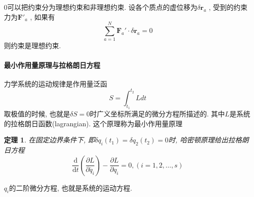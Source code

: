 \documentclass[a4paper,11pt]{article}
\theoremstyle{mystyle}
\newtheorem{theorem}{\hspace{2em}定理}[section]
\begin{document}
$0$可以把约束分为理想约束和非理想约束. 设各个质点的虚位移为$\delta\mathbf{r}_a$ , 受到的约束力为$\mathbf{F'}_a$ , 如果有
\begin{equation*}
  \sum_{a=1}^{N}\mathbf{F}_a'\cdot\delta\mathbf{r}_a=0
\end{equation*}
则约束是理想约束.
\paragraph*{最小作用量原理与拉格朗日方程}\label{Least Action section}
\begin{definition}[最小作用量原理]\label{Least Action rule}
  力学系统的运动规律是作用量泛函
\begin{equation*}
  S=\int_{t_1}^{t_2}Ldt
\end{equation*}
取极值的时候, 也就是$\delta S=0$时广义坐标所满足的微分方程所描述的. 其中$L$是系统的拉格朗日函数(lagrangian). 这个原理称为最小作用量原理
\end{definition}
\begin{theorem}
  在固定边界条件下, 即$\delta q_i(t_1)=\delta q_2(t_2)=0$时, 哈密顿原理给出拉格朗日方程
  \begin{equation*}
    \frac{\mathrm{d}}{\mathrm{d}t}(\frac{\partial {L}}{\partial{\dot{q_i}}})-\frac{\partial{L}}{\partial{q_i}}=0,(i=1,2,\dots,s)
  \end{equation*}
\end{theorem}
$q_i$的二阶微分方程, 也就是系统的运动方程.
\end{document}
